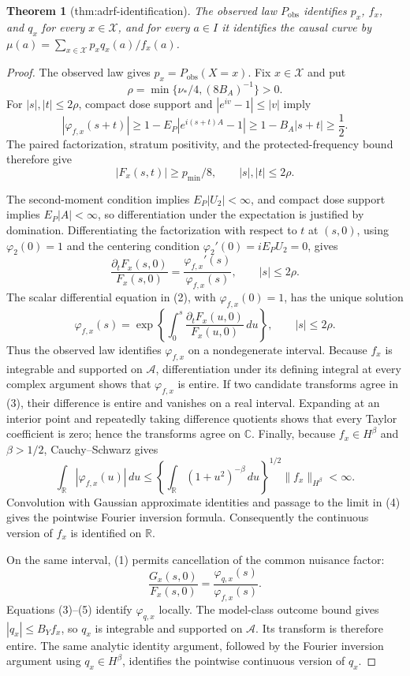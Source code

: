 \documentclass{article}
\newtheorem{theorem}{Theorem}
\begin{document}
\begin{theorem}[thm:adrf-identification]\label{thm:adrf-identification}
The observed law \(P_{\mathrm{obs}}\) identifies \(p_x\), \(f_x\), and \(q_x\) for every \(x\in\mathcal X\), and for every \(a\in I\) it identifies the causal curve by \(\mu(a)=\sum_{x\in\mathcal X}p_xq_x(a)/f_x(a)\).
\end{theorem}
\begin{proof}
The observed law gives \(p_x=P_{\mathrm{obs}}(X=x)\).  Fix \(x\in\mathcal X\) and put
\[
\rho=\min\{\nu_*/4,(8B_A)^{-1}\}>0.
\]
For \(|s|,|t|\le2\rho\), compact dose support and \(|e^{iv}-1|\le |v|\) imply
\[
|\varphi_{f,x}(s+t)|
\ge 1-E_P|e^{i(s+t)A}-1|
\ge 1-B_A|s+t|\ge\frac12.
\]
The paired factorization, stratum positivity, and the protected-frequency bound therefore give
\[
|F_x(s,t)|\ge p_{\min}/8,
\qquad |s|,|t|\le2\rho. \tag{1}
\]

The second-moment condition implies \(E_P|U_2|<\infty\), and compact dose support implies \(E_P|A|<\infty\), so differentiation under the expectation is justified by domination.  Differentiating the factorization with respect to \(t\) at \((s,0)\), using \(\varphi_2(0)=1\) and the centering condition \(\varphi_2'(0)=iE_PU_2=0\), gives
\[
\frac{\partial_tF_x(s,0)}{F_x(s,0)}
=\frac{\varphi_{f,x}'(s)}{\varphi_{f,x}(s)},
\qquad |s|\le2\rho. \tag{2}
\]
The scalar differential equation in (2), with \(\varphi_{f,x}(0)=1\), has the unique solution
\[
\varphi_{f,x}(s)=
\exp\!\left\{\int_0^s
\frac{\partial_tF_x(u,0)}{F_x(u,0)}\,du\right\},
\qquad |s|\le2\rho. \tag{3}
\]
Thus the observed law identifies \(\varphi_{f,x}\) on a nondegenerate interval.  Because \(f_x\) is integrable and supported on \(\mathcal A\), differentiation under its defining integral at every complex argument shows that \(\varphi_{f,x}\) is entire.  If two candidate transforms agree in (3), their difference is entire and vanishes on a real interval.  Expanding at an interior point and repeatedly taking difference quotients shows that every Taylor coefficient is zero; hence the transforms agree on \(\mathbb C\).  Finally, because \(f_x\in H^\beta\) and \(\beta>1/2\), Cauchy--Schwarz gives
\[
\int_{\mathbb R}|\varphi_{f,x}(u)|\,du
\le
\left\{\int_{\mathbb R}(1+u^2)^{-\beta}\,du\right\}^{1/2}
\|f_x\|_{H^\beta}<\infty. \tag{4}
\]
Convolution with Gaussian approximate identities and passage to the limit in (4) gives the pointwise Fourier inversion formula.  Consequently the continuous version of \(f_x\) is identified on \(\mathbb R\).

On the same interval, (1) permits cancellation of the common nuisance factor:
\[
\frac{G_x(s,0)}{F_x(s,0)}
=\frac{\varphi_{q,x}(s)}{\varphi_{f,x}(s)}. \tag{5}
\]
Equations (3)--(5) identify \(\varphi_{q,x}\) locally.  The model-class outcome bound gives \(|q_x|\le B_Yf_x\), so \(q_x\) is integrable and supported on \(\mathcal A\).  Its transform is therefore entire.  The same analytic identity argument, followed by the Fourier inversion argument using \(q_x\in H^\beta\), identifies the pointwise continuous version of \(q_x\).


\end{proof}
\end{document}
